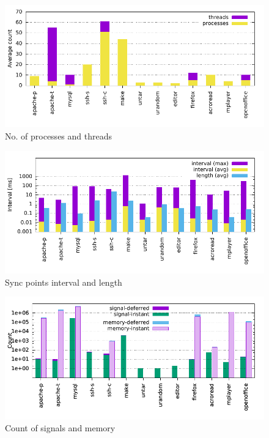 \begin{table}[]
\begin{figure}[t]
    \centering
    \includegraphics[width=\linewidth]{figures/scribe/totals}
  \vspace{-5em}
    \caption{No. of processes and threads}
    \label{scribe:fig:totals}
\end{figure}

\begin{figure}[t]
    \centering
    \includegraphics[width=\linewidth]{figures/scribe/syncpts2}
  \vspace{-5em}
    \caption{Sync points interval and length}
    \label{scribe:fig:syncpts}
\end{figure}

\begin{figure}[t]
    \centering
    \includegraphics[width=\linewidth]{figures/scribe/stats}
  \vspace{-5em}
    \caption{Count of signals and memory}
    \label{scribe:fig:stats}
\end{figure}


\end{table}
